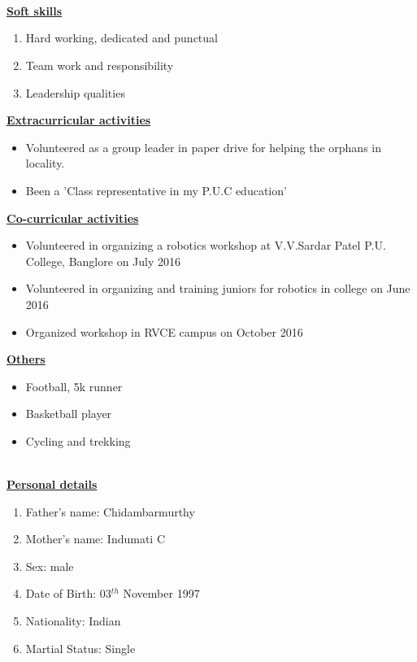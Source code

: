 \documentclass[10pt]{article}
\begin{document}
	\hfill\\
	\\ \\
	
	\underline{\textbf{\Large{Soft skills}}}
	\begin{enumerate}
		\item{Hard working, dedicated and punctual}
		\item{Team work and responsibility}
		\item{Leadership qualities} 
		
	\end{enumerate}

	\hfill
	
	\underline{\textbf{\Large{Extracurricular activities}}}
	\begin{itemize}
		\item{Volunteered as a group leader in paper drive for helping the orphans in locality.}
		\item{Been a 'Class representative in my P.U.C education'}
	\end{itemize}

	\hfill
	
	\underline{\textbf{\Large{Co-curricular activities}}}
	\begin{itemize}
		\item{Volunteered in organizing a robotics workshop at V.V.Sardar Patel P.U. College, Banglore on July 2016}
		\item{Volunteered in organizing and training juniors for robotics in college on June 2016}
		\item{Organized workshop in RVCE campus on October 2016}
		
	\end{itemize}
	\hfill
	
	\underline{\textbf{\Large{Others}}}
	\begin{itemize}
		\item{Football, 5k runner}
		\item{Basketball player}
		\item{Cycling and trekking}					
		
	\end{itemize}
	
	\hfill\\
	
	\underline{\textbf{\Large{Personal details}}}
	\begin{enumerate}
		\item{Father's name: Chidambarmurthy}
		\item{Mother's name: Indumati C}
		\item{Sex: male}
		\item{Date of Birth: 03$^{th}$ November 1997} %
		\item{Nationality: Indian} %
		\item{Martial Status: Single}
	\end{enumerate}
	
\end{document}
